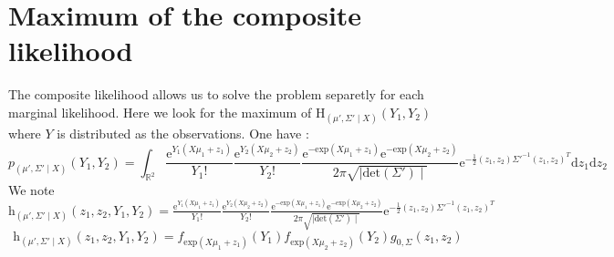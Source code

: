 \documentclass[11pt, a4paper]{article}
\begin{document}
\section{Maximum of the composite likelihood}
The composite likelihood allows us to solve the problem separetly for each marginal likelihood. Here we look for the maximum of $\mathrm{H}_{(\mu',\Sigma' \mid X)}(Y_1,Y_2)$ where $Y$ is distributed as the observations. One have : 
\begin{equation}
p_{(\mu',\Sigma' \mid X)}(Y_1,Y_2)=\int_{\mathbb{R}^2}\frac{\mathrm{e}^{Y_1(X \mu_1+z_1)}}{Y_1 !} \frac{\mathrm{e}^{Y_2(X \mu_2+z_2)}}{Y_2 !} \frac{\mathrm{e}^{-\mathrm{exp}(X\mu_1+z_1)}\mathrm{e}^{-\mathrm{exp}(X\mu_2+z_2)}}{2 \pi \sqrt{\mid \mathrm{det}(\Sigma') \mid} } \mathrm{e}^{-\frac{1}{2} (z_1,z_2) \Sigma'^{-1} (z_1,z_2)^T} \mathrm{d}z_1 \mathrm{d}z_2
\end{equation}
We note $ \mathrm{h}_{(\mu',\Sigma' \mid X)}(z_1,z_2,Y_1,Y_2) =\frac{\mathrm{e}^{Y_1(X \mu_1+z_1)}}{Y_1 !} \frac{\mathrm{e}^{Y_2(X \mu_2+z_2)}}{Y_2 !} \frac{\mathrm{e}^{-\mathrm{exp}(X\mu_1+z_1)}\mathrm{e}^{-\mathrm{exp}(X\mu_2+z_2)}}{2 \pi \sqrt{\mid \mathrm{det}(\Sigma') \mid} } \mathrm{e}^{-\frac{1}{2} (z_1,z_2) \Sigma'^{-1} (z_1,z_2)^T} $
\begin{equation}
\mathrm{h}_{(\mu',\Sigma' \mid X)}(z_1,z_2,Y_1,Y_2)= f_{\mathrm{exp}(X \mu_1+z_1)}(Y_1) f_{\mathrm{exp}(X \mu_2+z_2)}(Y_2) g_{0, \Sigma}(z_1,z_2)
\end{equation}
\end{document}
